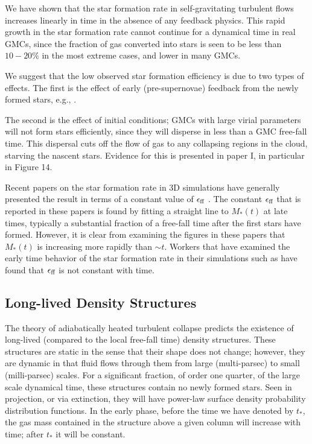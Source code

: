 \documentclass[iop,apj,numberedappendix]{emulateapj}
\newcommand       \phil[1]      {{\color{blue} #1}}
\newcommand       \eff          {\epsilon_{\rm ff}}
\begin{document}
We have shown that the star formation rate in self-gravitating
turbulent flows increases linearly in time in the absence of any feedback
physics. This rapid growth in the star formation rate cannot continue
for a dynamical time in real GMCs, since the fraction of gas converted
into stars is seen to be less than $10-20\%$ in the most extreme
cases, and lower in many GMCs. 

We suggest that the low observed star formation efficiency is due to
two types of effects. The first is the effect of early
(pre-supernovae) feedback from the newly formed stars, e.g.,
\citet{2010ApJ...709..191M}.

The second is the effect of initial conditions;
GMCs with large virial parameters will not form stars efficiently,
since they will disperse in less than a GMC free-fall time. This
dispersal cuts off the flow of gas to any collapsing regions in the
cloud, starving the nascent stars. Evidence for this is presented in
paper I, in particular in Figure 14.

Recent papers on the star formation rate in 3D simulations have
generally presented the result in terms of a constant value of $\eff$
\citep[e.g.][]{2011ApJ...730...40P,2012MNRAS.419.3115B,2012ApJ...754...71K}. 
The constant $\eff$ that is reported in these papers is found by
fitting a straight line to $M_*(t)$ at late times, typically a
substantial fraction of a free-fall time after the first stars have
formed. However, it is clear from examining the figures in these
papers that $M_*(t)$ is increasing more rapidly than $\sim t$.  
\phil{Workers that have examined the early time behavior of the star formation rate in their simulations such as 
\citet{Myer+14} have found that $\eff$ is not constant with time.}


\subsection{Long-lived Density Structures} 
The theory of adiabatically heated turbulent collapse predicts the
existence of long-lived (compared to the local free-fall time) density
structures. These structures are static in the sense that their shape
does not change; however, they are dynamic in that fluid flows through
them from large (multi-parsec) to small (milli-parsec) scales. For a
significant fraction, of order one quarter, of the large scale
dynamical time, these structures contain no newly formed stars. Seen
in projection, or via extinction, they will have power-law surface
density probability distribution functions. In the early phase, before
the time we have denoted by $t_*$, the gas mass contained in the
structure above a given column will increase with time; after $t_*$ it
will be constant.
\end{document}
